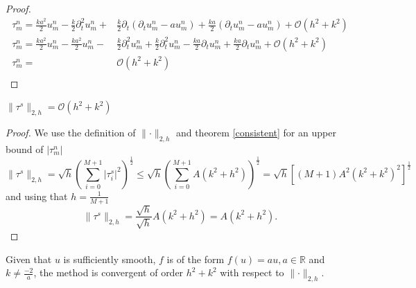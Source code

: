 \begin{proof}
    \begin{align*}
        \tau_m^n = \frac{ka^2}{2}u_{m}^{n}  - \frac{k}{2} \partial_t^2 u_{m}^{n} +& \frac{k}{2} \partial_t \left(\partial_t u_{m}^{n}   - au_{m}^{n} \right) + \frac{ka}{2} \left( \partial_t  u_{m}^{n} - a u_{m}^{n}\right)+ \mathcal{O}(h^2 + k^2) \\
        \tau_m^n = \frac{ka^2}{2}u_{m}^{n} - \frac{ka^2}{2}u_{m}^{n}  -& \frac{k}{2} \partial_t^2 u_{m}^{n} + \frac{k}{2} \partial_t^2 u_{m}^{n} - \frac{ka}{2} \partial_t u_{m}^{n} + \frac{ka}{2} \partial_t  u_{m}^{n}+ \mathcal{O}(h^2 + k^2) \\
        \tau_m^n =& \mathcal{O}(h^2 + k^2) \\
    \end{align*}
\end{proof}

\begin{corollary}
    \label{corollary:norm_tau}
    $\lVert\tau^s \lVert_{2, h} =\mathcal{O}(h^2+k^2)$
\end{corollary}

\begin{proof}
We use the definition of $\lVert\cdot\lVert_{2,h}$ and theorem \ref{consistent} for an upper bound of $\lvert \tau_m^n\lvert$
    $$\lVert\tau^s \lVert_{2, h} = \sqrt{h}\left( \sum_{i=0}^{M+1} \lvert\tau^s_i \lvert^2 \right)^\frac{1}{2} \leq \sqrt{h}\left( \sum_{i=0}^{M+1} A(k^2+h^2) \right)^\frac{1}{2} = \sqrt{h}\left[ (M+1) A^2(k^2+k^2)^2 \right]^\frac{1}{2}$$
    and using that $h = \frac{1}{M+1}$
    $$\lVert\tau^s \lVert_{2, h} = \frac{\sqrt{h}}{\sqrt{h}}A(k^2+h^2) = A(k^2+h^2).$$
\end{proof}

\begin{theorem}
    Given that $u$ is sufficiently smooth,  $f$ is of the form $f(u)=au, a\in \mathbb{R}$ and $k \neq \frac{-2}{a}$, the method is convergent of order $h^2+k^2$ with respect to $\lVert\cdot \lVert_{2, h}$.
\end{theorem}

